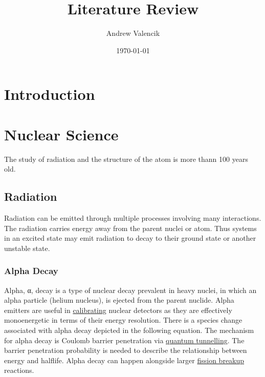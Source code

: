\documentclass[12pt]{article}
\begin{document}
\title{Literature Review}

\author{Andrew Valencik}

\date{\today}

\maketitle

\tableofcontents


\begin{doublespacing}

\section{Introduction}




\section{Nuclear Science}
The study of radiation and the structure of the atom is more thann 100 years old.

\subsection{Radiation}
Radiation can be emitted through multiple processes involving many interactions. The radiation carries energy away from the parent nuclei or atom. Thus systems in an excited state may emit radiation to decay to their ground state or another unstable state. 

\subsubsection{Alpha Decay}
Alpha, α, decay is a type of nuclear decay prevalent in heavy nuclei, in which an alpha particle (helium nucleus), is ejected from the parent nuclide. Alpha emitters are useful in \href{http://cs.smu.ca/~andrew/files/ugthesis/SMU-Thesis-v.1.0.1.pdf}{calibrating} nuclear detectors as they are effectively monoenergetic in terms of their energy resolution. There is a species change associated with alpha decay depicted in the following equation.
The mechanism for alpha decay is Coulomb barrier penetration via \href{https://en.wikipedia.org/wiki/Quantum_tunneling}{quantum tunnelling}. The barrier penetration probability is needed to describe the relationship between energy and halflife. Alpha decay can happen alongside larger \href{https://en.wikipedia.org/wiki/Nuclear_fission}{fission breakup} reactions.


\end{doublespacing}
\end{document}
